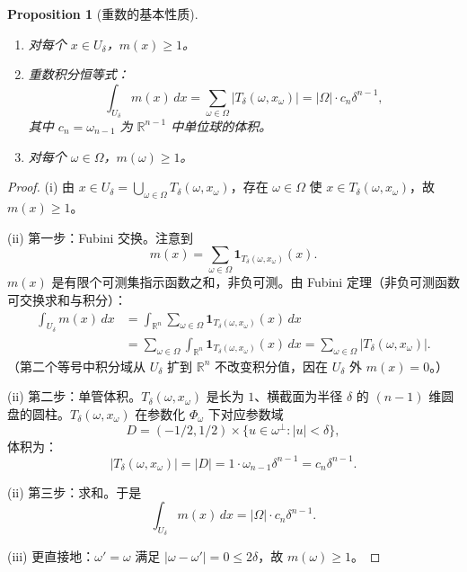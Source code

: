 \documentclass[11pt,a4paper]{article}
\newtheorem{proposition}[theorem]{Proposition}
\theoremstyle{remark}
\begin{document}
	\begin{proposition}[重数的基本性质]
		\begin{enumerate}
			\item[(i)] 对每个 $x\in U_\delta$，$m(x)\ge1$。
			\item[(ii)] 重数积分恒等式：
			\[
			\int_{U_\delta}m(x)\,dx
			=\sum_{\omega\in\Omega}|T_\delta(\omega,x_\omega)|
			=|\Omega|\cdot c_n\delta^{n-1},
			\]
			其中 $c_n=\omega_{n-1}$ 为 $\mathbb R^{n-1}$ 中单位球的体积。
			\item[(iii)] 对每个 $\omega\in\Omega$，$m(\omega)\ge1$。
		\end{enumerate}
	\end{proposition}
	
	\begin{proof}
		(i) 由 $x\in U_\delta=\bigcup_{\omega\in\Omega}T_\delta(\omega,x_\omega)$，存在 $\omega\in\Omega$ 使 $x\in T_\delta(\omega,x_\omega)$，故 $m(x)\ge1$。
		
		(ii) 第一步：Fubini 交换。注意到
		\[
		m(x)=\sum_{\omega\in\Omega}\mathbf 1_{T_\delta(\omega,x_\omega)}(x).
		\]
		$m(x)$ 是有限个可测集指示函数之和，非负可测。由 Fubini 定理（非负可测函数可交换求和与积分）：
		\begin{align*}
			\int_{U_\delta}m(x)\,dx
			&=\int_{\mathbb R^n}\sum_{\omega\in\Omega}\mathbf 1_{T_\delta(\omega,x_\omega)}(x)\,dx\\
			&=\sum_{\omega\in\Omega}\int_{\mathbb R^n}\mathbf 1_{T_\delta(\omega,x_\omega)}(x)\,dx
			=\sum_{\omega\in\Omega}|T_\delta(\omega,x_\omega)|.
		\end{align*}
		（第二个等号中积分域从 $U_\delta$ 扩到 $\mathbb R^n$ 不改变积分值，因在 $U_\delta$ 外 $m(x)=0$。）
		
		(ii) 第二步：单管体积。$T_\delta(\omega,x_\omega)$ 是长为 $1$、横截面为半径 $\delta$ 的 $(n-1)$ 维圆盘的圆柱。$T_\delta(\omega,x_\omega)$ 在参数化 $\Phi_\omega$ 下对应参数域
		\[
		D=(-1/2,1/2)\times\{u\in\omega^\perp:|u|<\delta\},
		\]
		体积为：
		\[
		|T_\delta(\omega,x_\omega)|=|D|
		=1\cdot\omega_{n-1}\delta^{n-1}=c_n\delta^{n-1}.
		\]
		
		(ii) 第三步：求和。于是
		\[
		\int_{U_\delta}m(x)\,dx=|\Omega|\cdot c_n\delta^{n-1}.
		\]
		
		(iii) 更直接地：$\omega'=\omega$ 满足 $|\omega-\omega'|=0\le2\delta$，故 $m(\omega)\ge1$。
	\end{proof}
	
\end{document}
